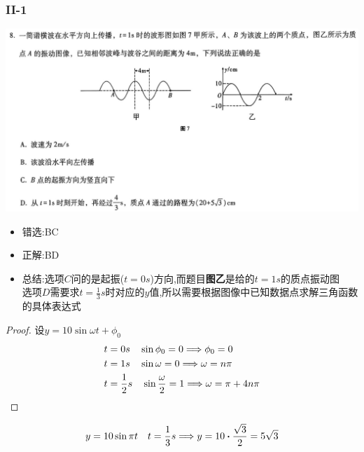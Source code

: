 \documentclass{article}
\begin{document}
    \subsubsection{II-1}
    \includegraphics[width=50em,keepaspectratio]{./pictures/1.3-2.png}

    \begin{itemize}
        \item 错选:\quad BC
        \item 正解:\quad BD
        \item 总结:\quad 选项$C$问的是起振($t=0s$)方向,而题目\textbf{图乙}是给的$t=1s$的质点振动图\\
                        选项$D$需要求$t=\frac{1}{3}s$时对应的$y$值,所以需要根据图像中已知数据点求解三角函数的具体表达式
    \end{itemize}

        \begin{proof}
            设$ y = 10 \sin{\omega t + \phi_{0}}$
            \begin{align*}
                t &= 0s \quad \sin{\phi_{0}} = 0 \Longrightarrow \phi_{0} = 0   \\
                t &= 1s \quad \sin{\omega} = 0 \Longrightarrow \omega = n\pi    \\
                t &= \frac{1}{2}s \quad \sin{\frac{\omega}{2}} = 1 \Longrightarrow \omega = \pi + 4n\pi
            \end{align*}
        \end{proof}
        $$
        y = 10\sin{\pi t} \quad t = \frac{1}{3}s \lra y = 10 \vdot \frac{\sqrt{3}}{2} = 5\sqrt{3}
        $$
    
\end{document}
